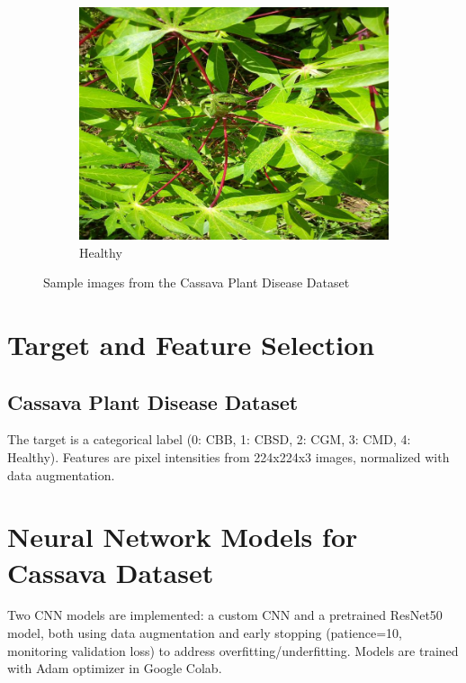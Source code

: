 \documentclass[a4paper,12pt]{article}
\begin{document}
\begin{figure}[H]
    \centering
    \begin{subfigure}{0.45\textwidth}
        \centering
        \includegraphics[width=\textwidth]{./assets/class_images/class_4.jpg}
        \caption{Healthy}
    \end{subfigure}
    \caption{Sample images from the Cassava Plant Disease Dataset}
\end{figure}

\section*{Target and Feature Selection}
\subsection*{Cassava Plant Disease Dataset}
The target is a categorical label (0: CBB, 1: CBSD, 2: CGM, 3: CMD, 4: Healthy). Features are pixel intensities from 224x224x3 images, normalized with data augmentation.


\section*{Neural Network Models for Cassava Dataset}
Two CNN models are implemented: a custom CNN and a pretrained ResNet50 model, both using data augmentation and early stopping (patience=10, monitoring validation loss) to address overfitting/underfitting. Models are trained with Adam optimizer in Google Colab.
\end{document}
